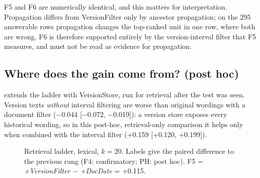 \documentclass[sigconf,anonymous,review]{acmart}
\newcommand{\sys}[1]{\textsf{#1}}
\begin{document}
F5 and F6 are numerically identical, and this matters for interpretation. \sys{Propagation} differs from \sys{VersionFilter} only by ancestor propagation; on the 295 answerable rows propagation changes the top-ranked unit in one row, where both are wrong. F6 is therefore supported entirely by the version-interval filter that F5 measures, and must not be read as evidence for propagation.

\subsection{Where does the gain come from? (post hoc)}

 extends the ladder with \sys{VersionStore}, run for retrieval after the test was seen. Version texts \emph{without} interval filtering are worse than original wordings with a document filter ($-$0.044 [$-$0.072, $-$0.019]): a version store exposes every historical wording, so in this post-hoc, retrieval-only comparison it helps only when combined with the interval filter ($+$0.159 [$+$0.120, $+$0.199]).

\begin{figure}[t]
\centering
{}
\caption{Retrieval ladder, lexical, $k=20$. Labels give the paired difference to the previous rung (F4: confirmatory; PH: post hoc). F5 = \textit{+VersionFilter} $-$ \textit{+DocDate} = $+$0.115.}
\label{fig:ladder}
\end{figure}
\end{document}
